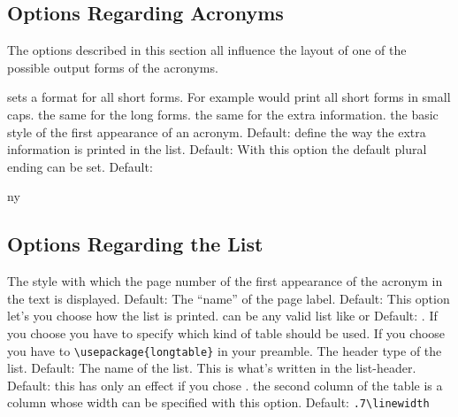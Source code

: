 \documentclass[DIV10,toc=index,toc=bib]{cnpkgdoc}
\begin{document}
\subsection{Options Regarding Acronyms}
The options described in this section all influence the layout of one of the
possible output forms of the acronyms.
\begin{beschreibung}
  sets a format for all short forms. For example
  would print all short forms in small caps.
  the same for the long forms.
  the same for the extra information.
  the basic style of
 the first appearance of an acronym. Default: 
  define the way the extra
 information is printed in the list. Default: 
  With this option the default plural ending
 can be set. Default: 
\end{beschreibung}

\begin{beispiel}
 \acf{ny}
\end{beispiel}

\subsection{Options Regarding the List}
\begin{beschreibung}
  The style with which the page number of
 the first appearance of the acronym in the text is displayed. Default: 
  The ``name'' of the page label. Default: 
  This option let's you choose how the list is
 printed.  can be any valid list like  or 
 Default: .
  If you choose 
 you have to specify which kind of table should be used. If you choose 
 you have to \verb+\usepackage{longtable}+ in your preamble.
 The header type of the list. Default: 
  The name of the list. This is what's written in
 the list-header. Default: 
  this has only an effect if you chose .
 the second column of the table is a  column whose width can be specified
 with this option. Default: \verb+.7\linewidth+
\end{beschreibung}
\end{document}
